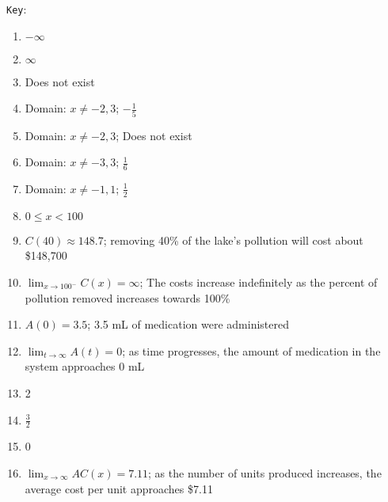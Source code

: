 \documentclass{article}
\begin{document}
\texttt{Key}:
\begin{enumerate}
    \item $-\infty$
    \item $\infty$
    \item Does not exist
    \item Domain: $x \neq -2, 3$; $-\tfrac{1}{5}$
    \item Domain: $x \neq -2, 3$; Does not exist
    \item Domain: $x \neq -3, 3$; $\tfrac{1}{6}$
    \item Domain: $x \neq -1, 1$; $\tfrac{1}{2}$
    \item $0 \leq x < 100$
    \item $C(40)\approx 148.7$; removing 40\% of the lake's pollution will cost about \$148,700
    \item $\lim_{x \to 100^-}C(x) = \infty$; The costs increase indefinitely as the percent of pollution removed increases towards 100\%
    \item $A(0) = 3.5$; 3.5 mL of medication were administered
    \item $\lim_{t \to \infty} A(t) = 0$; as time progresses, the amount of medication in the system approaches 0 mL
    \item 2
    \item $\tfrac{3}{2}$
    \item 0
    \item $\lim_{x \to \infty} AC(x) = 7.11$; as the number of units produced increases, the average cost per unit approaches \$7.11
\end{enumerate}
\end{document}
